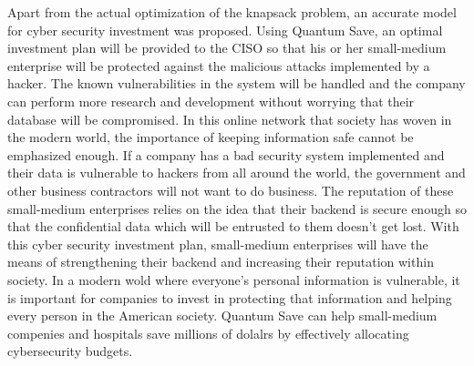 \indent Apart from the actual optimization of the knapsack problem, an accurate model for cyber security investment was proposed. Using Quantum Save, an optimal investment plan will be provided to the CISO so that his or her small-medium enterprise will be protected against the malicious attacks implemented by a hacker. The known vulnerabilities in the system will be handled and the company can perform more research and development without worrying that their database will be compromised. In this online network that society has woven in the modern world, the importance of keeping information safe cannot be emphasized enough. If a company has a bad security system implemented and their data is vulnerable to hackers from all around the world, the government and other business contractors will not want to do business. The reputation of these small-medium enterprises relies on the idea that their backend is secure enough so that the confidential data which will be entrusted to them doesn't get lost. With this cyber security investment plan, small-medium enterprises will have the means of strengthening their backend and increasing their reputation within society. In a modern wold where everyone's personal information is vulnerable, it is important for companies to invest in protecting that information and helping every person in the American society. Quantum Save can help small-medium compenies and hospitals save millions of dolalrs by effectively allocating cybersecurity budgets.
